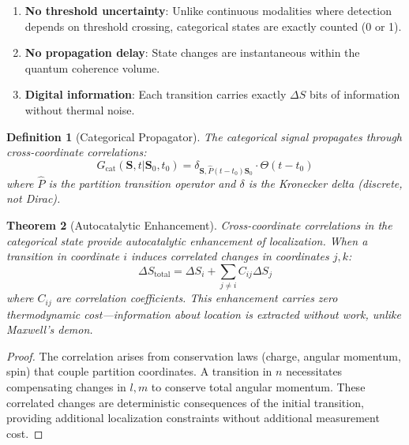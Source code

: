 \documentclass[11pt,a4paper]{article}
\newtheorem{theorem}{Theorem}[section]
\newtheorem{definition}[theorem]{Definition}
\theoremstyle{remark}
\newcommand{\Scoord}{\mathbf{S}}
\newcommand{\rxntime}{t_0}
\begin{document}
\begin{enumerate}
    \item \textbf{No threshold uncertainty}: Unlike continuous modalities where detection depends on threshold crossing, categorical states are exactly counted (0 or 1).

    \item \textbf{No propagation delay}: State changes are instantaneous within the quantum coherence volume.

    \item \textbf{Digital information}: Each transition carries exactly $\Delta S$ bits of information without thermal noise.
\end{enumerate}

\begin{definition}[Categorical Propagator]
The categorical signal propagates through cross-coordinate correlations:
\begin{equation}
    G_{\text{cat}}(\Scoord, t | \Scoord_0, \rxntime) = \delta_{\Scoord, \hat{P}(t-\rxntime)\Scoord_0} \cdot \Theta(t - \rxntime)
\end{equation}
where $\hat{P}$ is the partition transition operator and $\delta$ is the Kronecker delta (discrete, not Dirac).
\end{definition}

\begin{theorem}[Autocatalytic Enhancement]
\label{thm:autocatalytic}
Cross-coordinate correlations in the categorical state provide autocatalytic enhancement of localization. When a transition in coordinate $i$ induces correlated changes in coordinates $j, k$:
\begin{equation}
    \Delta S_{\text{total}} = \Delta S_i + \sum_{j \neq i} C_{ij} \Delta S_j
\end{equation}
where $C_{ij}$ are correlation coefficients. This enhancement carries zero thermodynamic cost---information about location is extracted without work, unlike Maxwell's demon.
\end{theorem}

\begin{proof}
The correlation arises from conservation laws (charge, angular momentum, spin) that couple partition coordinates. A transition in $n$ necessitates compensating changes in $l, m$ to conserve total angular momentum. These correlated changes are deterministic consequences of the initial transition, providing additional localization constraints without additional measurement cost.
\end{proof}
\end{document}

